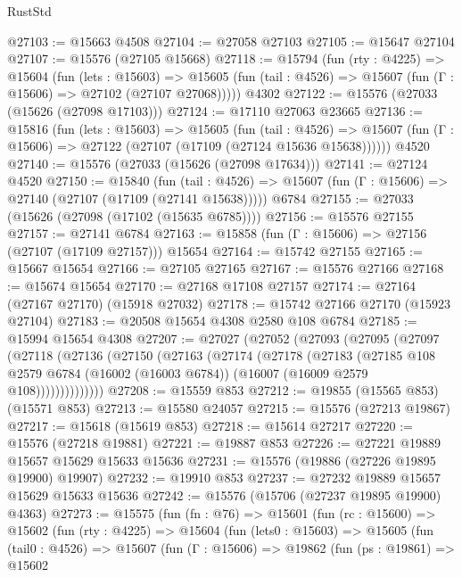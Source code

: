 \begin{lexlean}{RustStd}
\begin{coremodule}
@27103 := @15663 @4508
@27104 := @27058 @27103
@27105 := @15647 @27104
@27107 := @15576 (@27105 @15668)
@27118 := @15794
    (fun (rty : @4225) =>
    @15604
      (fun (lets : @15603) =>
      @15605 (fun (tail : @4526) => @15607 (fun (Γ : @15606) => @27102 (@27107 @27068)))))
    @4302
@27122 := @15576 (@27033 (@15626 (@27098 @17103)))
@27124 := @17110 @27063 @23665
@27136 := @15816
    (fun (lets : @15603) =>
    @15605
      (fun (tail : @4526) =>
      @15607 (fun (Γ : @15606) => @27122 (@27107 (@17109 (@27124 @15636 @15638))))))
    @4520
@27140 := @15576 (@27033 (@15626 (@27098 @17634)))
@27141 := @27124 @4520
@27150 := @15840
    (fun (tail : @4526) => @15607 (fun (Γ : @15606) => @27140 (@27107 (@17109 (@27141 @15638)))))
    @6784
@27155 := @27033 (@15626 (@27098 (@17102 (@15635 @6785))))
@27156 := @15576 @27155
@27157 := @27141 @6784
@27163 := @15858 (fun (Γ : @15606) => @27156 (@27107 (@17109 @27157))) @15654
@27164 := @15742 @27155
@27165 := @15667 @15654
@27166 := @27105 @27165
@27167 := @15576 @27166
@27168 := @15674 @15654
@27170 := @27168 @17108 @27157
@27174 := @27164 (@27167 @27170) (@15918 @27032)
@27178 := @15742 @27166 @27170 (@15923 @27104)
@27183 := @20508 @15654 @4308 @2580 @108 @6784
@27185 := @15994 @15654 @4308
@27207 := @27027
    (@27052
      (@27093
        (@27095
          (@27097
            (@27118
              (@27136
                (@27150
                  (@27163
                    (@27174
                      (@27178
                        (@27183
                          (@27185
                            @108
                            @2579
                            @6784
                            (@16002 (@16003 @6784))
                            (@16007 (@16009 @2579 @108))))))))))))))
@27208 := @15559 @853
@27212 := @19855 (@15565 @853) (@15571 @853)
@27213 := @15580 @24057
@27215 := @15576 (@27213 @19867)
@27217 := @15618 (@15619 @853)
@27218 := @15614 @27217
@27220 := @15576 (@27218 @19881)
@27221 := @19887 @853
@27226 := @27221 @19889 @15657 @15629 @15633 @15636
@27231 := @15576 (@19886 (@27226 @19895 @19900) @19907)
@27232 := @19910 @853
@27237 := @27232 @19889 @15657 @15629 @15633 @15636
@27242 := @15576 (@15706 (@27237 @19895 @19900) @4363)
@27273 := @15575
    (fun (fn : @76) =>
    @15601
      (fun (rc : @15600) =>
      @15602
        (fun (rty : @4225) =>
        @15604
          (fun (lets0 : @15603) =>
          @15605
            (fun (tail0 : @4526) =>
            @15607
              (fun (Γ : @15606) =>
              @19862
                (fun (ps : @19861) =>
                @15602

\end{coremodule}
\end{lexlean}
